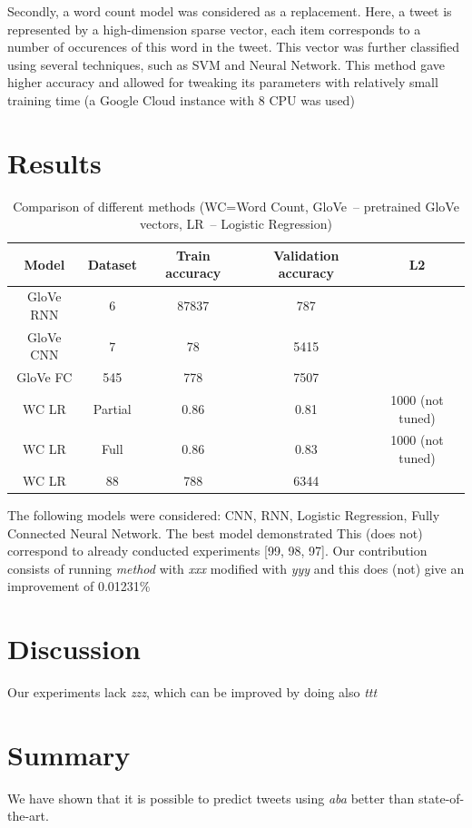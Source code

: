 \documentclass[10pt,conference,compsocconf]{IEEEtran}
\begin{document}
Secondly, a word count model was considered as a replacement.
Here, a tweet is represented by a high-dimension sparse vector, each item corresponds to a number of occurences of this word in the tweet.
This vector was further classified using several techniques, such as SVM and Neural Network.
This method gave higher accuracy and allowed for tweaking its parameters with relatively small training time (a Google Cloud instance with 8 CPU was used)
\section{Results}
\begin{table}[ht]
	\centering
	\begin{tabular}{|c | c |  c | c | c |} 
		\hline
		Model & Dataset & Train accuracy & Validation accuracy & L2 \\ [0.5ex] 
		\hline
		GloVe RNN & 6 & 87837 & 787  \\ 
		\hline
		GloVe CNN & 7 & 78 & 5415 \\
		\hline
		GloVe FC & 545 & 778 & 7507 \\
		\hline
		WC LR & Partial & 0.86 & 0.81 & 1000 (not tuned) \\
		\hline
		WC LR & Full & 0.86 & 0.83 & 1000 (not tuned) \\
		\hline
		WC LR & 88 & 788 & 6344 \\ [1ex] 
		\hline
	\end{tabular}
	\caption{Comparison of different methods (WC=Word Count, GloVe~-- pretrained GloVe vectors, LR~-- Logistic Regression)}
	\label{tab:results}
\end{table}

The following models were considered: CNN, RNN, Logistic Regression, Fully Connected Neural Network. The best model demonstrated This (does not) correspond to already conducted experiments [99, 98, 97]. Our contribution consists of running {\em method} with {\em xxx} modified with {\em yyy} and this does (not) give an improvement of 0.01231\%
\section{Discussion}
Our experiments lack {\em zzz}, which can be improved by doing also {\em ttt}
\section{Summary}
We have shown that it is possible to predict tweets using {\em aba} better than state-of-the-art.
\end{document}
